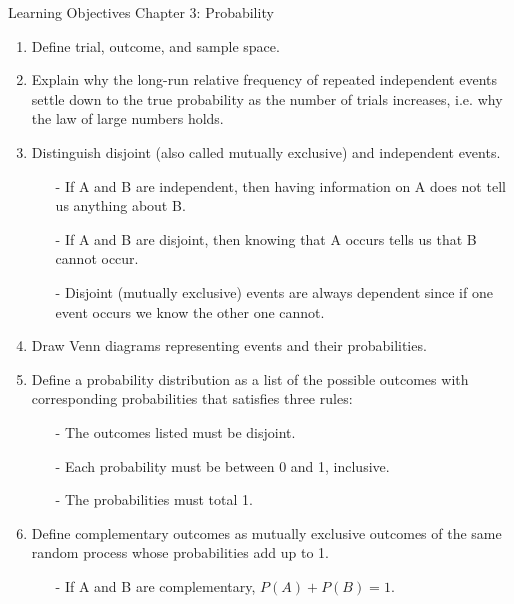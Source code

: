 \documentclass[11pt]{article}
\begin{document}
{\LARGE \textcolor{oiB}{Learning Objectives \hfill Chapter 3: Probability}} \\

\begin{enumerate}
\renewcommand\labelenumi{\textcolor{light}{\textbf{LO \theenumi.}}}

\item Define trial, outcome, and sample space.

\item Explain why the long-run relative frequency of repeated independent events settle down to the true probability as the number of trials increases, i.e. why the law of large numbers holds.

\item Distinguish disjoint (also called mutually exclusive) and independent events.
\begin{itemize}
\item[-] If A and B are independent, then having information on A does not tell us anything about B.
\item[-] If A and B are disjoint, then knowing that A occurs tells us that B cannot occur.
\item[-] Disjoint (mutually exclusive) events are always dependent since if one event occurs we know the other one cannot.
\end{itemize}

\item Draw Venn diagrams representing events and their probabilities.

\item Define a probability distribution as a list of the possible outcomes with corresponding probabilities that satisfies three rules: 
\begin{itemize}
\item[-] The outcomes listed must be disjoint. 
\item[-] Each probability must be between 0 and 1, inclusive.
\item[-] The probabilities must total 1. 
\end{itemize}

\item Define complementary outcomes as mutually exclusive outcomes of the same random process whose probabilities add up to 1. 
\begin{itemize}
\item[-] If A and B are complementary, $P(A) + P(B) = 1$.
\end{itemize}


\end{enumerate}
\end{document}
